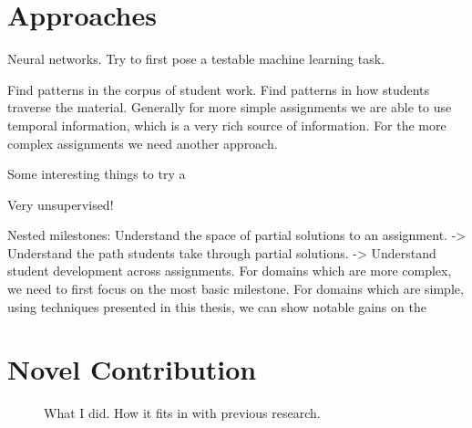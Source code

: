 \section{Approaches}


Neural networks. Try to first pose a testable machine learning task. \cite{piech2012modeling}

Find patterns in the corpus of student work. Find patterns in how students traverse the material. Generally for more simple assignments we are able to use temporal information, which is a very rich source of information. For the more complex assignments we need another approach.

Some interesting things to try a

Very unsupervised!

Nested milestones: Understand the space of partial solutions to an assignment.
->
Understand the path students take through partial solutions.
->
Understand student development across assignments. 
For domains which are more complex, we need to first focus on the most basic milestone. For domains which are simple, using techniques presented in this thesis, we can show notable gains on the 

\section{Novel Contribution}

\begin{figure}[h]
\center
{}

\caption{
 What I did.
 How it fits in with previous research.
}
\end{figure}




